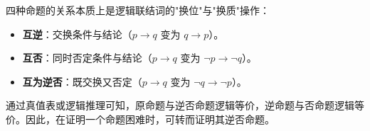 \begin{explanationbox}
四种命题的关系本质上是逻辑联结词的"换位"与"换质"操作：
\begin{itemize}
    \item \textbf{互逆}：交换条件与结论（\(p\to q\) 变为 \(q\to p\)）。
    \item \textbf{互否}：同时否定条件与结论（\(p\to q\) 变为 \(\lnot p\to\lnot q\)）。
    \item \textbf{互为逆否}：既交换又否定（\(p\to q\) 变为 \(\lnot q\to\lnot p\)）。
\end{itemize}
通过真值表或逻辑推理可知，原命题与逆否命题逻辑等价，逆命题与否命题逻辑等价。因此，在证明一个命题困难时，可转而证明其逆否命题。
\end{explanationbox}